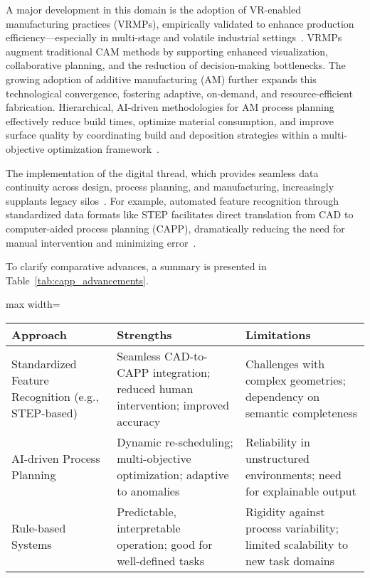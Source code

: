 A major development in this domain is the adoption of VR-enabled manufacturing practices (VRMPs), empirically validated to enhance production efficiency—especially in multi-stage and volatile industrial settings~\cite{ref83}. VRMPs augment traditional CAM methods by supporting enhanced visualization, collaborative planning, and the reduction of decision-making bottlenecks. The growing adoption of additive manufacturing (AM) further expands this technological convergence, fostering adaptive, on-demand, and resource-efficient fabrication. Hierarchical, AI-driven methodologies for AM process planning effectively reduce build times, optimize material consumption, and improve surface quality by coordinating build and deposition strategies within a multi-objective optimization framework~\cite{ref2,ref5,ref6,ref7,ref15,ref20,ref27,ref44,ref47,ref48,ref52,ref58,ref59,ref69,ref84}.

The implementation of the digital thread, which provides seamless data continuity across design, process planning, and manufacturing, increasingly supplants legacy silos~\cite{ref11,ref51}. For example, automated feature recognition through standardized data formats like STEP facilitates direct translation from CAD to computer-aided process planning (CAPP), dramatically reducing the need for manual intervention and minimizing error~\cite{ref51}.

To clarify comparative advances, a summary is presented in Table~\ref{tab:capp_advancements}.

\begin{table*}[htbp]
\centering
\caption{Comparative Advances in Automated Process Planning}
\label{tab:capp_advancements}
\begin{adjustbox}{max width=\textwidth}
\begin{tabular}{lll}
\toprule
\textbf{Approach} & \textbf{Strengths} & \textbf{Limitations} \\
\midrule
Standardized Feature Recognition (e.g., STEP-based) & Seamless CAD-to-CAPP integration; reduced human intervention; improved accuracy & Challenges with complex geometries; dependency on semantic completeness \\
AI-driven Process Planning & Dynamic re-scheduling; multi-objective optimization; adaptive to anomalies & Reliability in unstructured environments; need for explainable output \\
Rule-based Systems & Predictable, interpretable operation; good for well-defined tasks & Rigidity against process variability; limited scalability to new task domains \\
\bottomrule
\end{tabular}
\end{adjustbox}
\end{table*}

